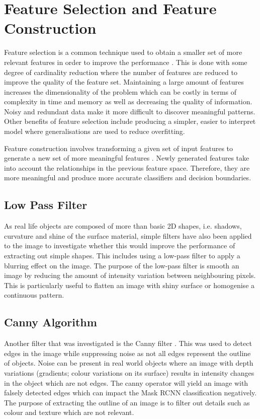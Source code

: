 \section{Feature Selection and Feature Construction}\label{subsubsec:fsfc}

Feature selection is a common technique used to obtain a smaller set of more relevant features in order to improve the performance \cite{yu2004efficient}. This is done with some degree of cardinality reduction where the number of features are reduced to improve the quality of the feature set. Maintaining a large amount of features increases the dimensionality of the problem which can be costly in terms of complexity in time and memory as well as decreasing the quality of information. Noisy and redundant data make it more difficult to discover meaningful patterns. Other benefits of feature selection include producing a simpler, easier to interpret model where generalisations are used to reduce overfitting.

Feature construction involves transforming a given set of input features to generate a new set of more meaningful features \cite{markovitch2002feature}. Newly generated features take into account the relationships in the previous feature space. Therefore, they are more meaningful and produce more accurate classifiers and decision boundaries. 

\subsection{Low Pass Filter}
As real life objects are composed of more than basic 2D shapes, i.e. shadows, curvature and shine of the surface material, simple filters have also been applied to the image to investigate whether this would improve the performance of extracting out simple shapes. This includes using a low-pass filter to apply a blurring effect on the image. The purpose of the low-pass filter is smooth an image by reducing the amount of intensity variation between neighbouring pixels. This is particularly useful to flatten an image with shiny surface or homogenise a continuous pattern.

\subsection{Canny Algorithm}

Another filter that was investigated is the Canny filter \cite{canny1986computational}. This was used to detect edges in the image while suppressing noise as not all edges represent the outline of objects. Noise can be present in real world objects where an image with depth variations (gradients; colour variations on its surface) results in intensity changes in the object which are not edges. The canny operator will yield an image with falsely detected edges which can impact the Mask RCNN classification negatively. The purpose of extracting the outline of an image is to filter out details such as colour and texture which are not relevant.

